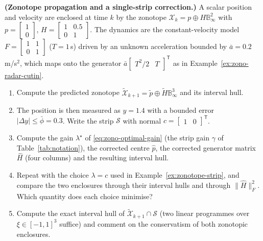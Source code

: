 \documentclass[graybox,envcountchap]{style/SNmono}
\begin{document}
\begin{prob}\label{prob:ch03:6}
\textbf{(Zonotope propagation and a single-strip correction.)} A scalar position and velocity are enclosed at time $k$ by the zonotope $\mathcal{X}_k=p\oplus H\mathbb{B}_{\infty}^{2}$ with
$p=\begin{bmatrix}1\\0\end{bmatrix}$, $H=\begin{bmatrix}1&0.5\\0&1\end{bmatrix}$.
The dynamics are the constant-velocity model $F=\begin{bmatrix}1&1\\0&1\end{bmatrix}$ ($T=1$\,s) driven by an unknown acceleration bounded by $\bar a=0.2$\,m/s$^{2}$, which maps onto the generator $\bar a\begin{bmatrix}T^{2}/2&T\end{bmatrix}^{\mathsf T}$ as in Example~\ref{ex:zono-radar-cutin}.
\begin{enumerate}
\item[(a)] Compute the predicted zonotope $\widetilde{\mathcal{X}}_{k+1}=\tilde p\oplus\tilde H\mathbb{B}_{\infty}^{3}$ and its interval hull.
\item[(b)] The position is then measured as $y=1.4$ with a bounded error $|\Delta y|\le\bar\phi=0.3$. Write the strip $\mathcal{S}$ with normal $c=\begin{bmatrix}1&0\end{bmatrix}^{\mathsf T}$.
\item[(c)] Compute the gain $\lambda^{\star}$ of \eqref{eq:zono-optimal-gain} (the strip gain $\gamma$ of Table~\ref{tab:notation}), the corrected centre $\hat p$, the corrected generator matrix $\hat H$ (four columns) and the resulting interval hull.
\item[(d)] Repeat with the choice $\lambda=c$ used in Example~\ref{ex:zonotope-strip}, and compare the two enclosures through their interval hulls and through $\|\hat H\|_{F}^{2}$. Which quantity does each choice minimise?
\item[(e)] Compute the exact interval hull of $\widetilde{\mathcal{X}}_{k+1}\cap\mathcal{S}$ (two linear programmes over $\xi\in[-1,1]^{3}$ suffice) and comment on the conservatism of both zonotopic enclosures.
\end{enumerate}
\end{prob}
\end{document}
